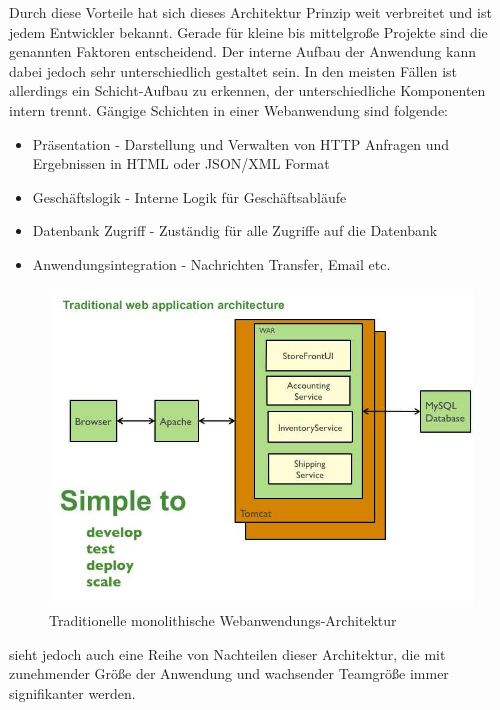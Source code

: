 	Durch diese Vorteile hat sich dieses Architektur Prinzip weit verbreitet und ist jedem Entwickler bekannt. Gerade für kleine bis mittelgroße Projekte sind die genannten Faktoren entscheidend. Der interne Aufbau der Anwendung kann dabei jedoch sehr unterschiedlich gestaltet sein. In den meisten Fällen ist allerdings ein Schicht-Aufbau zu erkennen, der unterschiedliche Komponenten intern trennt. Gängige Schichten in einer Webanwendung sind folgende:
	\begin{itemize}
	\item Präsentation - Darstellung und Verwalten von HTTP Anfragen und Ergebnissen in HTML oder JSON/XML Format
	\item Geschäftslogik - Interne Logik für Geschäftsabläufe
	\item Datenbank Zugriff - Zuständig für alle Zugriffe auf die Datenbank
	\item Anwendungsintegration - Nachrichten Transfer, Email etc.
	\end{itemize}
	
	\begin{figure}[h]
		\centering
		\includegraphics[width=0.9\linewidth]{images/TraditionalWebArchitecture}
		\caption{Traditionelle monolithische Webanwendungs-Architektur}
		\label{fig:TraditionalWebArchitecture}
	\end{figure}

	\cite*{Richardson.2014} sieht jedoch auch eine Reihe von Nachteilen dieser Architektur, die mit zunehmender Größe der Anwendung und wachsender Teamgröße immer signifikanter werden.
	
